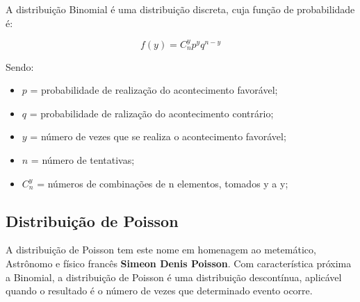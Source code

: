 \inic A distribuição Binomial é uma distribuição discreta, cuja função de probabilidade é:
 
\begin{equation}
f(y) = C_{n}^{y}p^{y}q^{n-y}
\end{equation}
 
Sendo: \vskip0.3cm

\begin{itemize}
\item $p$ = probabilidade de realização do acontecimento favorável; 
\item  $q$ = probabilidade de ralização do acontecimento contrário;  
\item $y$ = número de vezes que se realiza o acontecimento favorável;  
\item $n$ = número de tentativas; 
\item $C_{n}^{y}$ = números de combinações de n elementos, tomados y a y; 
\end{itemize} 

\newpage
\subsection{Distribuição de Poisson}

A distribuição de Poisson tem este nome em homenagem ao metemático, Astrônomo e físico francês \textbf{Simeon Denis Poisson}. Com característica próxima a Binomial, a distribuição de Poisson é uma distribuição descontínua, aplicável quando o resultado é o número de vezes que determinado evento ocorre. 


